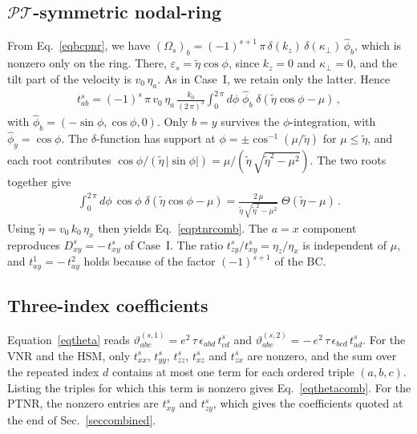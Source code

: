 \documentclass[aps,prb,onecolumn,nofootinbib,citeautoscript,10pt]{revtex4-2}
\begin{document}
\subsection{$\mathcal{PT}$-symmetric nodal-ring}

From Eq.~\eqref{eqbcpnr}, we have $(\Omega_s)_b=(-1)^{s+1}\,\pi\,\delta(k_z)\,\delta(\kappa_\perp)\,\hat\phi_b$, which is nonzero only on the ring. There, $\varepsilon_s=\tilde\eta\cos\phi$, since $k_z=0$ and $\kappa_\perp=0$, and the tilt part of the velocity is $v_0\,\eta_a$. As in Case~I, we retain only the latter. Hence
\begin{align}
t^s_{ab} = (-1)^{s}\,\pi\,v_0\,\eta_a\,\frac{k_0}{(2\,\pi)^3} \int_0^{2\,\pi} d\phi\; \hat\phi_b\;\delta (\tilde\eta\cos\phi-\mu) \,,
\end{align}
with $\hat\phi_b=(-\sin\phi,\cos\phi,0)$. Only $b=y$ survives the $\phi$-integration, with $\hat\phi_y=\cos\phi$. The $\delta$-function has support at $\phi=\pm\cos^{-1}(\mu/\tilde\eta)$ for $\mu\le\tilde\eta$, and each root contributes $\cos\phi/(\tilde\eta\,|\sin\phi|)=\mu/(\tilde\eta\,\sqrt{\tilde\eta^2-\mu^2})$. The two roots together give
\begin{align}
\int_0^{2\,\pi} d\phi\,\cos\phi\;\delta (\tilde\eta\cos\phi-\mu) = \frac{2\,\mu}{\tilde\eta\,\sqrt{\tilde\eta^2-\mu^2}}\;\Theta(\tilde\eta-\mu)\,.
\end{align}
Using $\tilde\eta=v_0\,k_0\,\eta_x$ then yields Eq.~\eqref{eqptnrcomb}. The $a=x$ component reproduces $D^s_{xy}=-\,t^s_{xy}$ of Case~I. The ratio $t^s_{zy}/t^s_{xy}=\eta_z/\eta_x$ is independent of $\mu$, and $t^1_{ay}=-\,t^2_{ay}$ holds because of the factor $(-1)^{s+1}$ of the BC.

\subsection{Three-index coefficients}

Equation~\eqref{eqtheta} reads $\vartheta^{(s,1)}_{abc}=e^2\,\tau\,\epsilon_{abd}\,t^s_{cd}$ and $\vartheta^{(s,2)}_{abc}=-\,e^2\,\tau\,\epsilon_{bcd}\,t^s_{ad}$. For the VNR and the HSM, only $t^s_{xx}$, $t^s_{yy}$, $t^s_{zz}$, $t^s_{xz}$ and $t^s_{zx}$ are nonzero, and the sum over the repeated index $d$ contains at most one term for each ordered triple $(a,b,c)$. Listing the triples for which this term is nonzero gives Eq.~\eqref{eqthetacomb}. For the PTNR, the nonzero entries are $t^s_{xy}$ and $t^s_{zy}$, which gives the coefficients quoted at the end of Sec.~\ref{seccombined}.
\end{document}

